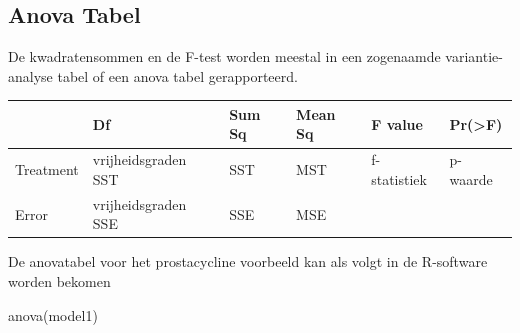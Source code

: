 \documentclass[
  dutch,
  letterpaper,
  12pt]{book}
\newenvironment{Shaded}{\begin{snugshade}}{\end{snugshade}}
\newcommand{\FunctionTok}[1]{\textcolor[rgb]{0.28,0.35,0.67}{#1}}
\newcommand{\NormalTok}[1]{\textcolor[rgb]{0.00,0.23,0.31}{#1}}
\newcounter{none} %
\theoremstyle{definition}
\theoremstyle{definition}
\theoremstyle{definition}
\theoremstyle{remark}
\begin{document}
\subsection{Anova Tabel}\label{anova-tabel-1}

De kwadratensommen en de F-test worden meestal in een zogenaamde
variantie-analyse tabel of een anova tabel gerapporteerd.

{\def\LTcaptype{none} %
\begin{longtable}[]{@{}
  >{\raggedright\arraybackslash}p{}
  >{\raggedright\arraybackslash}p{}
  >{\raggedright\arraybackslash}p{}
  >{\raggedright\arraybackslash}p{}
  >{\raggedright\arraybackslash}p{}
  >{\raggedright\arraybackslash}p{}@{}}
\toprule\noalign{}
\begin{minipage}[b]{\linewidth}\raggedright
\end{minipage} & \begin{minipage}[b]{\linewidth}\raggedright
Df
\end{minipage} & \begin{minipage}[b]{\linewidth}\raggedright
Sum Sq
\end{minipage} & \begin{minipage}[b]{\linewidth}\raggedright
Mean Sq
\end{minipage} & \begin{minipage}[b]{\linewidth}\raggedright
F value
\end{minipage} & \begin{minipage}[b]{\linewidth}\raggedright
Pr(\textgreater F)
\end{minipage} \\
\midrule\noalign{}
\endhead
\bottomrule\noalign{}
\endlastfoot
Treatment & vrijheidsgraden SST & SST & MST & f-statistiek & p-waarde \\
Error & vrijheidsgraden SSE & SSE & MSE & & \\
\end{longtable}
}

De anovatabel voor het prostacycline voorbeeld kan als volgt in de
R-software worden bekomen

\begin{Shaded}
\begin{Highlighting}[]
\FunctionTok{anova}\NormalTok{(model1)}
\end{Highlighting}
\end{Shaded}
\end{document}
